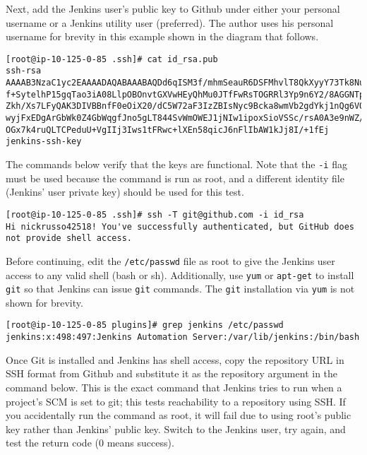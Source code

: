 Next, add the Jenkins user's public key to Github under either your personal
username or a Jenkins utility user (preferred). The author uses his personal
username for brevity in this example shown in the diagram that follows.

\begin{verbatim}
[root@ip-10-125-0-85 .ssh]# cat id_rsa.pub
ssh-rsa AAAAB3NzaC1yc2EAAAADAQABAAABAQDd6qISM3f/mhmSeauR6DSFMhvlT8QkXyyY73Tk8Nu
f+SytelhP15gqTao3iA08LlpOBOnvtGXVwHEyQhMu0JTfFwRsTOGRRl3Yp9n6Y2/8AGGNTp+Q4tGpcz
Zkh/Xs7LFyQAK3DIVBBnfF0eOiX20/dC5W72aF3IzZBIsNyc9Bcka8wmVb2gdYkj1nQg6VQI1C6yayL
wyjFxEDgArGbWk0Z4GbWqgfJno5gLT844SvWmOWEJ1jNIw1ipoxSioVSSc/rsA0A3e9nWZ/HQGUbbhI
OGx7k4ruQLTCPeduU+VgIIj3Iws1tFRwc+lXEn58qicJ6nFlIbAW1kJj8I/+1fEj jenkins-ssh-key
\end{verbatim}


The commands below verify that the keys are functional. Note that the
\verb|-i| flag must be used because the command is run as root, and a
different identity file (Jenkins' user private key) should be used for this test.

\begin{verbatim}
[root@ip-10-125-0-85 .ssh]# ssh -T git@github.com -i id_rsa
Hi nickrusso42518! You've successfully authenticated, but GitHub does not provide shell access.
\end{verbatim}

Before continuing, edit the \verb|/etc/passwd| file as root to give the
Jenkins user access to any valid shell (bash or sh). Additionally, use \verb|yum|
or \verb|apt-get| to install \verb|git| so that Jenkins can issue \verb|git|
commands. The \verb|git| installation via \verb|yum| is not shown for brevity.

\begin{verbatim}
[root@ip-10-125-0-85 plugins]# grep jenkins /etc/passwd
jenkins:x:498:497:Jenkins Automation Server:/var/lib/jenkins:/bin/bash
\end{verbatim}

Once Git is installed and Jenkins has shell access, copy the repository URL in
SSH format from Github and substitute it as the repository argument in the
command below. This is the exact command that Jenkins tries to run when a
project's SCM is set to git; this tests reachability to a repository using
SSH\@. If you accidentally run the command as root, it will fail due to using
root's public key rather than Jenkins' public key. Switch to the Jenkins user,
try again, and test the return code (0 means success).

